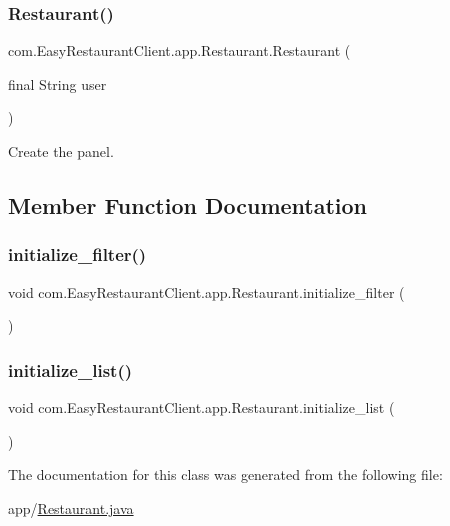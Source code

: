 \subsubsection{\texorpdfstring{Restaurant()}{Restaurant()}}
{\footnotesize\ttfamily com.\+Easy\+Restaurant\+Client.\+app.\+Restaurant.\+Restaurant (\begin{DoxyParamCaption}\item[{final String}]{user }\end{DoxyParamCaption})}

Create the panel. 

\subsection{Member Function Documentation}
\mbox{\label{classcom_1_1_easy_restaurant_client_1_1app_1_1_restaurant_a1a9bc07c10ae7f0e4ba3291c275dda34}} 
\subsubsection{\texorpdfstring{initialize\_filter()}{initialize\_filter()}}
{\footnotesize\ttfamily void com.\+Easy\+Restaurant\+Client.\+app.\+Restaurant.\+initialize\+\_\+filter (\begin{DoxyParamCaption}{ }\end{DoxyParamCaption})}

\mbox{\label{classcom_1_1_easy_restaurant_client_1_1app_1_1_restaurant_a6c5df9953401d5eb446c0db8685c1a19}} 
\subsubsection{\texorpdfstring{initialize\_list()}{initialize\_list()}}
{\footnotesize\ttfamily void com.\+Easy\+Restaurant\+Client.\+app.\+Restaurant.\+initialize\+\_\+list (\begin{DoxyParamCaption}{ }\end{DoxyParamCaption})}



The documentation for this class was generated from the following file\+:\begin{DoxyCompactItemize}
\item 
app/\mbox{\hyperlink{_restaurant_8java}{Restaurant.\+java}}\end{DoxyCompactItemize}
